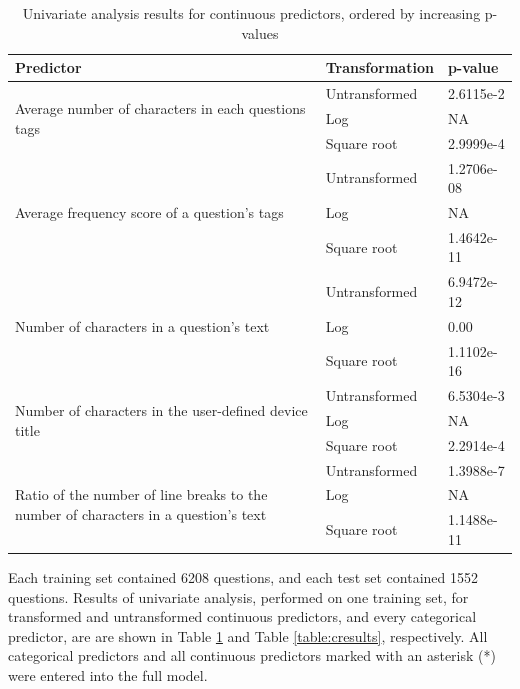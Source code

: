 \documentclass{article}
\begin{document}
\begin{table}[!htbp]
\centering
\caption{Univariate analysis results for continuous predictors, ordered by increasing p-values} 
\begin{tabular}{| p{5cm} | l | l |}
  \hline
  Predictor & Transformation & p-value \\ 
  \hline
  \multirow{3}{5cm}{Average number of characters in each questions tags}
  & Untransformed & 2.6115e-2 \\ 
  & Log & NA \\
  & Square root & 2.9999e-4 \\ \hline
  \multirow{3}{5cm}{Average frequency score of a question’s tags}
  & Untransformed & 1.2706e-08 \\
  & Log & NA \\
  & Square root & 1.4642e-11 \\ \hline
  \multirow{3}{5cm}{Number of characters in a question's text}
  & Untransformed & 6.9472e-12 \\
  & Log & 0.00 \\
  & Square root & 1.1102e-16 \\ \hline
  \multirow{3}{5cm}{Number of characters in the user-defined device title}
  & Untransformed & 6.5304e-3 \\
  & Log & NA \\
  & Square root & 2.2914e-4 \\ \hline
  \multirow{3}{5cm}{Ratio of the number of line breaks to the number of characters in a question's text} 
  & Untransformed & 1.3988e-7 \\
  & Log & NA \\
  & Square root & 1.1488e-11 \\ \hline
\end{tabular}
\label{table:qresults}
\end{table}


Each training set contained 6208 questions, and each test set contained 1552 questions. Results of univariate analysis, performed on one training set, for transformed and untransformed continuous predictors, and every categorical predictor, are are shown in Table \ref{table:qresults} and Table \ref{table:cresults}, respectively. All categorical predictors and all continuous predictors marked with an asterisk (*) were entered into the full model.
\end{document}
